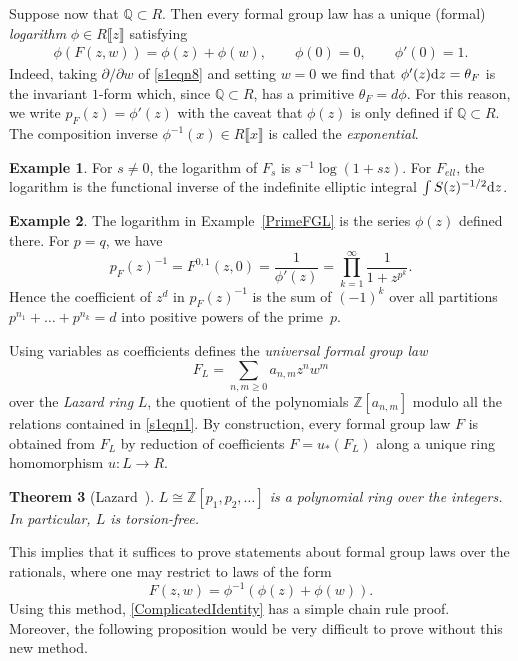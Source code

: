 \documentclass[pdftex]{sigma}
\numberwithin{equation}{section}
\newtheorem{Theorem}{Theorem}[section]
\theoremstyle{definition}
\newtheorem{Example}[Theorem]{Example}
\def\lb{\llbracket}
\def\rb{\rrbracket}
\begin{document}
Suppose now that $\mathbb{Q}\subset R$. Then every formal group law has a unique (formal) \emph{logarithm} $\phi\in R\lb z\rb$ satisfying
\begin{align}
\label{s1eqn8}
 \phi(F(z,w))=\phi(z)+\phi(w), \qquad\phi(0)=0, \qquad\phi'(0)=1.
\end{align}
Indeed, taking $\partial/\partial w$ of \eqref{s1eqn8} and setting $w=0$ we find that $\phi'(z){\rm d}z=\theta_F$ is the invariant $1$-form which, since $\mathbb{Q}\subset R$, has a primitive $\theta_F=d\phi$. For this reason, we write $p_F(z)=\phi'(z)$ with the caveat that $\phi(z)$ is only defined if $\mathbb{Q}\subset R$.
The composition inverse $\phi^{-1}(x)\in R\lb x\rb$ is called the \emph{exponential}.

\begin{Example}
For $s\neq0$, the logarithm of $F_s$ is $s^{-1}\log(1+sz)$. For $F_{ell}$, the logarithm is the functional inverse of the indefinite elliptic integral $\int S(z)^{-1/2}{\rm d}z$.
\end{Example}

\begin{Example}
 The logarithm in Example~\ref{PrimeFGL} is the series $\phi(z)$ defined there. For $p=q$, we have
 \[
 p_F(z)^{-1}=F^{0,1}(z,0)=\frac{1}{\phi'(z)}=\prod_{k=1}^\infty\frac{1}{1+z^{p^k}}.
 \]
 Hence the coefficient of $z^d$ in $p_F(z)^{-1}$ is the sum of $(-1)^k$ over all partitions $p^{n_1}+\dots+p^{n_k}=d$ into positive powers of the prime~$p$.
\end{Example}


Using variables as coefficients defines the \emph{universal formal group law}
\[
F_L=\sum_{n,m\geqslant0}a_{n,m}z^nw^m
\]
over the \emph{Lazard ring} $L$, the quotient of the polynomials $\mathbb{Z}[a_{n,m}]$ modulo all the relations contained in \eqref{s1eqn1}. By construction, every formal group law $F$ is obtained from $F_L$ by reduction of coefficients $F=u_*(F_L)$ along a unique ring homomorphism $u\colon L\to R$.

\begin{Theorem}[{Lazard~\cite{Laz}}]
$L\cong\mathbb{Z}[p_1,p_2,\dots]$ is a polynomial ring over the integers. In particular, $L$ is torsion-free.
\end{Theorem}

This implies that it suffices to prove statements about formal group laws over the rationals, where one may restrict to laws of the form
\begin{equation}\label{s1eqn9}
 F(z,w)=\phi^{-1}(\phi(z)+\phi(w)).
\end{equation}
Using this method, \eqref{ComplicatedIdentity} has a simple chain rule proof. Moreover, the following proposition would be very difficult to prove without this new method.
\end{document}
